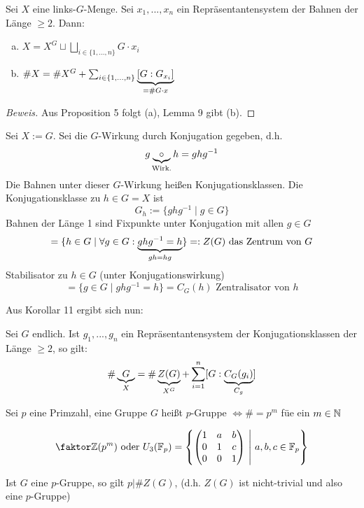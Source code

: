 \documentclass[a4paper]{report}
\begin{document}
\begin{kor}
  Sei $X$ eine links-$G$-Menge. Sei $x_{1}, ..., x_{n}$ ein Repräsentantensystem der Bahnen der Länge $\ge 2$. Dann:
  \begin{enumerate}[(a)]
  \item \(X = X^{G} \sqcup \bigsqcup_{i \in \{1, ..., n\}} G \cdot x_{i}\)
  \item \(\# X = \# X^{G} + \sum_{i \in \{1, ..., n\}}\underbrace{[G:G_{x_{i}}]}_{=\#G \cdot x}\)
  \end{enumerate}
\end{kor}
\begin{proof}[Beweis]
Aus Proposition 5 folgt (a), Lemma 9 gibt (b).
\end{proof}
\begin{anw*}
Sei $X:= G$. Sei die $G$-Wirkung durch Konjugation gegeben, d.h. \[g \underbrace {\circ}_{\text{Wirk.}} h = ghg^{-1}\]
Die Bahnen unter dieser $G$-Wirkung heißen Konjugationsklassen. Die Konjugationsklasse zu $h \in G = X$ ist \[G_{h} := \{ghg^{-1} \mid g \in G\}\]
Bahnen der Länge 1 sind Fixpunkte unter Konjugation mit allen $g \in G$
\[= \{h \in G \mid \forall g \in G : \underbrace{ghg^{-1} = h}_{gh = hg} \} =: Z(G) \text{ das Zentrum von }G\]
Stabilisator zu $h \in G$ (unter Konjugationswirkung)
\[ = \{g \in G \mid ghg^{-1} = h\} = C_{G}(h) \text{ Zentralisator von } h\]
\end{anw*}
Aus Korollar 11 ergibt sich nun:
\begin{satz}[Klassengleichung]
  Sei $G$ endlich. Ist $g_{1}, ..., g_{n}$ ein Repräsentantensystem der Konjugationsklassen der Länge $\ge 2$, so gilt:
  \[\# \underbrace{G}_{X} = \#\underbrace{Z(G)}_{X^{G}} + \sum_{i = 1}^{n}[G : \underbrace{C_{G}(g_{i})}_{C_{g}}]\]
\end{satz}

\begin{defi}
Sei $p$ eine Primzahl, eine Gruppe $G$ heißt $p$-Gruppe $\iff \# = p^{m}$ füe ein $m \in \mathbb{N}$
\end{defi}
\begin{bsp*}
  \[\fak \Z{(p^{m})} \text{ oder } U_{3}(\Bbb F_{p}) =
    \l\{\begin{pmatrix}
      1 & a & b \\
      0 & 1 & c \\
      0 & 0 & 1
  \end{pmatrix} \ \middle | \ a, b, c \in \Bbb F_{p} \r\}\]
\end{bsp*}

\begin{kor}
  Ist $G$ eine $p$-Gruppe, so gilt $p | \#Z(G)$, (d.h. $Z(G)$ ist nicht-trivial und also eine $p$-Gruppe)
\end{kor}
\end{document}
